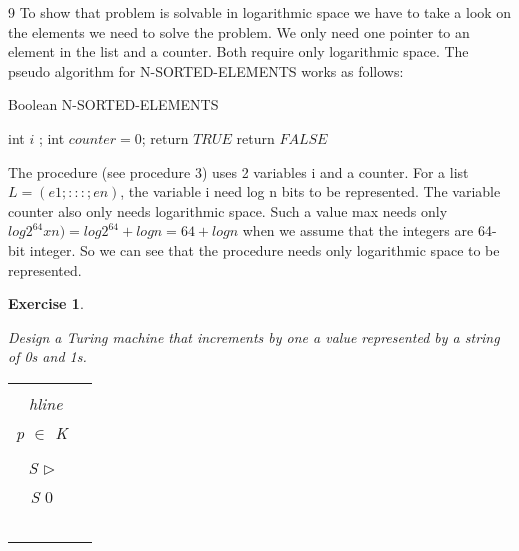 \documentclass [11pt]{article}
\newtheorem{exercise}[theorem]{Exercise}
\newcommand{\solution}[1]{\noindent {\bf Solution.}  #1}
\begin{document}
\solution{ 9}
To show that problem is solvable in logarithmic space we have to take a look on the elements we need to solve the problem. We only need one pointer to an element in the list and a counter. Both require only logarithmic space. The pseudo algorithm  for
N-SORTED-ELEMENTS works as follows:

\begin{algorithm}
\caption{Boolean N-SORTED-ELEMENTS }
\label{Bsort}
\begin{algorithmic}

 \State int $i$ ;
 \State int $counter = 0$;
     return $TRUE$
   \EndIf
  \EndIf
 \EndFor
 \State return $FALSE$
\EndFunction
\end{algorithmic}
\end{algorithm}

\medskip
The procedure (see procedure 3) uses 2 variables i  and a  counter. For a list $ L = (e1; : : : ; en) $,
the variable i need log n bits to be represented. The
variable counter also only needs logarithmic space. Such a value max needs only
$ log 2^64 x n) = log 2^64 + log n = 64 + log n$ when we assume that the integers are 64-bit integer.
So we can see that the procedure needs only logarithmic space to be represented.



\begin{exercise}
  \label{ex:turing}

  Design a Turing machine that increments by one a value represented by a string of 0s and 1s.
  
\bigskip  
  
\begin{tabular}{|c|c|}
\hline \\
\ hline\\ p $\in $ K &  \\ 
\hline  \\ 
 S  $\triangleright$ & \\ 
\hline  S  $0$ & \\ 
\hline  &  \\ 
\hline  &  \\ 
\hline  &  \\ 
\hline  &  \\ 
\hline  &  \\ 
\hline 
\end{tabular} 
\end{exercise}


\end{document}
